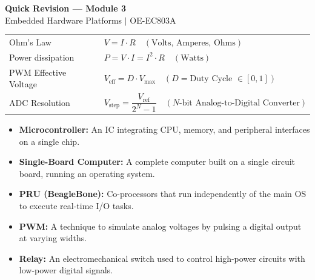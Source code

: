 \documentclass[12pt,a4paper]{article}
\renewcommand{\arraystretch}{1.45}
\begin{document}
\newpage

\begin{center}
  {\large\bfseries\color{myred} Quick Revision — Module 3}\\[3pt]
  {\small\color{mydark} Embedded Hardware Platforms $|$ OE-EC803A}
\end{center}
\noindent{\color{myred}\rule{\linewidth}{1.2pt}}
\vspace{8pt}

\begin{tcolorbox}[formulabox, title={\textbf{Key Formulas and Metrics at a Glance}}]
\renewcommand{\arraystretch}{1.35}
\begin{tabularx}{\linewidth}{B{5.0cm} X}
  Ohm's Law & $V = I \cdot R \quad (\text{Volts, Amperes, Ohms})$ \\[4pt]
  Power dissipation & $P = V \cdot I = I^2 \cdot R \quad (\text{Watts})$ \\[4pt]
  PWM Effective Voltage & $V_{\text{eff}} = D \cdot V_{\text{max}} \quad (D = \text{Duty Cycle } \in [0, 1])$ \\[4pt]
  ADC Resolution & $V_{\text{step}} = \dfrac{V_{\text{ref}}}{2^N - 1} \quad (N\text{-bit Analog-to-Digital Converter})$
\end{tabularx}
\end{tcolorbox}

\vspace{6pt}

\begin{tcolorbox}[defbox, title={\textbf{One-Line Definitions}}]
\begin{itemize}[leftmargin=*, itemsep=3pt, topsep=0pt]
  \item \textbf{Microcontroller:} An IC integrating CPU, memory, and peripheral interfaces on a single chip.
  \item \textbf{Single-Board Computer:} A complete computer built on a single circuit board, running an operating system.
  \item \textbf{PRU (BeagleBone):} Co-processors that run independently of the main OS to execute real-time I/O tasks.
  \item \textbf{PWM:} A technique to simulate analog voltages by pulsing a digital output at varying widths.
  \item \textbf{Relay:} An electromechanical switch used to control high-power circuits with low-power digital signals.
\end{itemize}
\end{tcolorbox}
\end{document}
